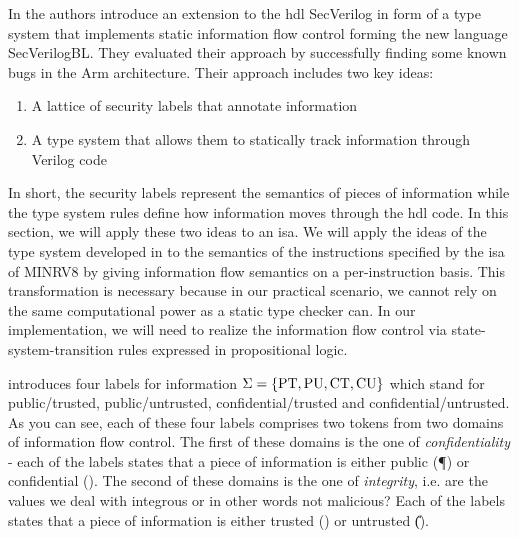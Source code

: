 

In \cite{Ferraiuolo17} the authors introduce an extension to the \gls{hdl} SecVerilog in form of a type system that implements static information flow control forming the new language SecVerilogBL.
They evaluated their approach by successfully finding some known bugs in the Arm architecture.
Their approach includes two key ideas:
\begin{enumerate}
    \item A lattice of security labels that annotate information
    \item A type system that allows them to statically track information through Verilog code
\end{enumerate}
In short, the security labels represent the semantics of pieces of information while the type system rules define how information moves through the \gls{hdl} code.
In this section, we will apply these two ideas to an \gls{isa}.
We will apply the ideas of the type system developed in \cite{Ferraiuolo17} to the semantics of the instructions specified by the \gls{isa} of MINRV8 by giving information flow semantics on a per-instruction basis.
This transformation is necessary because in our practical scenario, we cannot rely on the same computational power as a static type checker can.
In our implementation, we will need to realize the information flow control via state-system-transition rules expressed in propositional logic.

\cite{Ferraiuolo17} introduces four labels for information $ \Sigma = \{ \text{PT}, \text{PU}, \text{CT}, \text{CU} \} $ which stand for public/trusted, public/untrusted, confidential/trusted and confidential/untrusted.
As you can see, each of these four labels comprises two tokens from two domains of information flow control.
The first of these domains is the one of \textit{confidentiality} - each of the labels states that a piece of information is either public (\P{}) or confidential (\C{}).
The second of these domains is the one of \textit{integrity}, i.e. are the values we deal with integrous or in other words not malicious?
Each of the labels states that a piece of information is either trusted (\T{}) or untrusted (\U{}).

